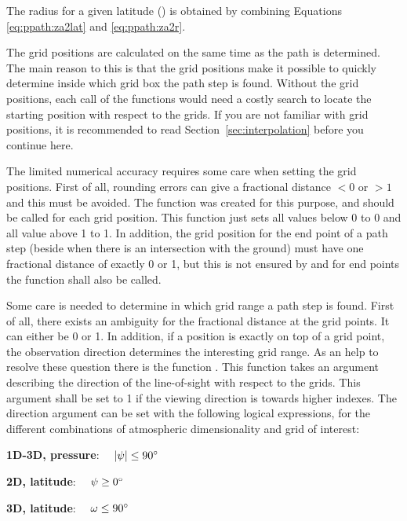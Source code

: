 The radius for a given latitude ()
is obtained by combining Equations \ref{eq:ppath:za2lat} and
\ref{eq:ppath:za2r}.




The grid positions are calculated on the same time as the path is
determined. The main reason to this is that the grid positions make it
possible to quickly determine inside which grid box the path step is
found. Without the grid positions, each call of the functions would
need a costly search to locate the starting position with respect to
the grids.  If you are not familiar with grid positions, it is
recommended to read Section~\ref{sec:interpolation} before you
continue here.

The limited numerical accuracy requires some care when setting the
grid positions. First of all, rounding errors can give a fractional
distance $< 0$ or $> 1$ and this must be avoided. The function
 was created for this purpose, and
should be called for each grid position. This function just
sets all values below 0 to 0 and all value above 1 to 1. In addition,
the grid position for the end point of a path step (beside when there
is an intersection with the ground) must have one fractional
distance of exactly 0 or 1, but this is not ensured by
 and for end points the function
 shall also be called.

Some care is needed to determine in which grid range a path step is
found. First of all, there exists an ambiguity for the fractional
distance at the grid points. It can either be 0 or 1. In addition, if
a position is exactly on top of a grid point, the observation
direction determines the interesting grid range. As an help to resolve
these question there is the function .
This function takes an argument describing the direction of the
line-of-sight with respect to the grids. This argument shall be set to
1 if the viewing direction is towards higher indexes. The direction
argument can be set with the following logical expressions, for the
different combinations of atmospheric dimensionality and grid of
interest:

 {\bf 1D-3D, pressure}: $\quad |\psi| \leq 90^\circ$

 {\bf 2D, latitude}: $\quad \psi \geq 0^\circ$

 {\bf 3D, latitude}: $\quad \omega \leq 90^\circ$

